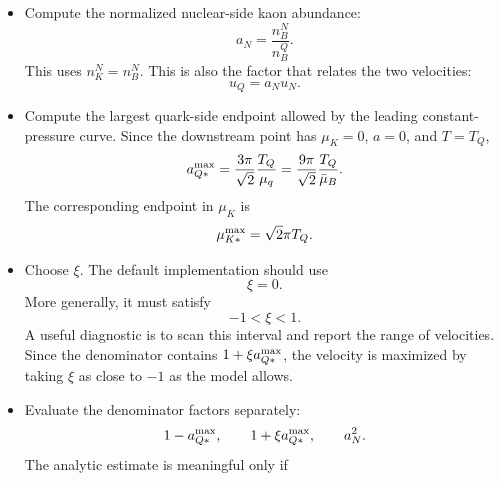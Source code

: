 \begin{itemize}
\begin{equation}
\tau
=
\left[
\frac{128}{27}
\times
\frac{1}{5\pi^3}
G_F^2
\cos^2\theta_c
\sin^2\theta_c
\mu_q^5
\right]^{-1}.
\end{equation}
Equivalently, one may use
\begin{equation}
\tau
\simeq
1.3\times10^{-9}\,{\rm s}
\left(\frac{300\,{\rm MeV}}{\mu_q}\right)^5 .
\end{equation}
The code should convert this time to the same unit system used in the
diffusion coefficient and velocity formula, then set
\begin{equation}
\gamma=\frac{1}{\tau}.
\end{equation}
\item Compute the normalized nuclear-side kaon abundance:
\begin{equation}
a_N=\frac{n_B^N}{n_B^Q}.
\end{equation}
This uses \(n_K^N=n_B^N\). This is also the factor that relates the two
velocities:
\begin{equation}
u_Q=a_Nu_N.
\end{equation}
\item Compute the largest quark-side endpoint allowed by the leading
constant-pressure curve. Since the downstream point has \(\mu_K=0\), \(a=0\),
and \(T=T_Q\),
\begin{equation}
a_{Q*}^{\rm max}
=
\frac{3\pi}{\sqrt{2}}\frac{T_Q}{\mu_q}
=
\frac{9\pi}{\sqrt{2}}\frac{T_Q}{\bar\mu_B}.
\end{equation}
The corresponding endpoint in \(\mu_K\) is
\begin{equation}
\mu_{K*}^{\rm max}
=
\sqrt{2}\pi T_Q .
\end{equation}
\item Choose \(\xi\). The default implementation should use
\begin{equation}
\xi=0.
\end{equation}
More generally, it must satisfy
\begin{equation}
-1<\xi<1.
\end{equation}
A useful diagnostic is to scan this interval and report the range of velocities.
Since the denominator contains \(1+\xi a_{Q*}^{\rm max}\), the velocity is
maximized by taking \(\xi\) as close to \(-1\) as the model allows.
\item Evaluate the denominator factors separately:
\begin{equation}
1-a_{Q*}^{\rm max},
\qquad
1+\xi a_{Q*}^{\rm max},
\qquad
a_N^2.
\end{equation}
The analytic estimate is meaningful only if

\end{itemize}

